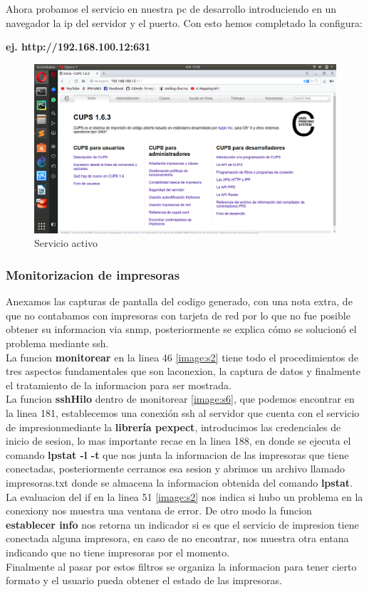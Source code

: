 Ahora probamos el servicio en nuestra pc de desarrollo introduciendo en un navegador la ip del servidor y el puerto. Con esto hemos completado la configura:
\\
\begin{center}
					\textbf{ej. http://192.168.100.12:631}
\end {center}
\FloatBarrier
\begin{figure}[htbp!]
		\centering
			\includegraphics[width=.9\textwidth]{images/r8}
		\caption{Servicio activo}
		\label{image:r8}
\end{figure}
\FloatBarrier


\subsubsection{Monitorizacion de impresoras}

Anexamos las capturas de pantalla del codigo generado, con una nota extra, de que no contabamos con impresoras con tarjeta de red por lo que no fue posible obtener su informacion via snmp, posteriormente se explica cómo se solucionó el problema mediante ssh.
\\
La funcion \textbf{monitorear} en la linea 46 \ref{image:s2} tiene todo el procedimientos de tres aspectos fundamentales que son laconexion, la captura de datos y finalmente el tratamiento de la informacion para ser mostrada.
\\
La funcion \textbf{sshHilo} dentro de monitorear \ref{image:s6}, que podemos encontrar en la linea 181, establecemos una conexión ssh al servidor que cuenta con el servicio de impresionmediante la \textbf{librería pexpect}, introducimos las credenciales de inicio de sesion, lo mas importante recae en la linea 188, en donde se ejecuta el comando \textbf{lpstat -l -t} que nos junta la informacion de las impresoras que tiene conectadas, posteriormente cerramos esa sesion y abrimos un archivo llamado impresoras.txt donde se almacena la informacion obtenida del comando \textbf{lpstat}.
\\
La evaluacion del if en la linea 51 \ref{image:s2} nos indica si hubo un problema en la conexiony nos muestra una ventana de error.
De otro modo la funcion \textbf{establecer info} nos retorna un indicador si es que el servicio de impresion tiene conectada alguna impresora, en caso de no encontrar, nos muestra otra  entana indicando que no tiene impresoras por el momento.
\\
Finalmente al pasar por estos filtros se organiza la informacion para tener cierto formato y el usuario pueda obtener el estado de las impresoras.

